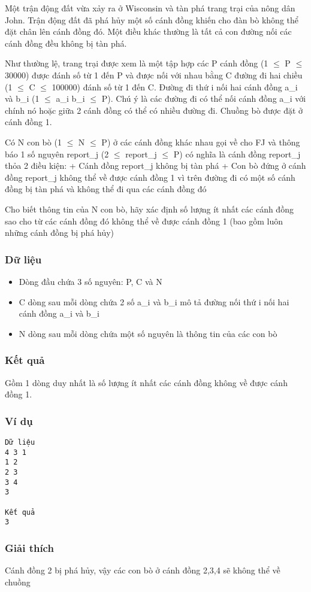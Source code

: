 



   Một trận động đất vừa xảy ra ở Wisconsin và tàn phá trang trại của nông dân John. Trận động đất đã phá hủy một số cánh đồng khiến cho đàn bò không thể đặt chân lên cánh đồng đó. Một điều khác thường là tất cả con đường nối các cánh đồng đều không bị tàn phá.  

   Như thường lệ, trang trại được xem là một tập hợp các P cánh đồng (1 $\le$ P $\le$ 30000) được đánh số từ 1 đến P và được nối với nhau bằng C đường đi hai chiều (1 $\le$ C $\le$ 100000) đánh số từ 1 đến C. Đường đi thứ i nối hai cánh đồng a\_i và b\_i (1 $\le$ a\_i b\_i $\le$ P). Chú ý là các đường đi có thể nối cánh đồng a\_i với chính nó hoặc giữa 2 cánh đồng có thể có nhiều đường đi. Chuồng bò được đặt ở cánh đồng 1.  

   Có N con bò (1 $\le$ N $\le$ P) ở các cánh đồng khác nhau gọi về cho FJ và thông báo 1 số nguyên report\_j (2 $\le$ report\_j $\le$ P) có nghĩa là cánh đồng report\_j thỏa 2 điều kiện: + Cánh đồng report\_j không bị tàn phá + Con bò đứng ở cánh đồng report\_j không thể về được cánh đồng 1 vì trên đường đi có một số cánh đồng bị tàn phá và không thể đi qua các cánh đồng đó  

   Cho biết thông tin của N con bò, hãy xác định số lượng ít nhất các cánh đồng sao cho từ các cánh đồng đó không thể về được cánh đồng 1 (bao gồm luôn những cánh đồng bị phá hủy)  

\subsubsection{   Dữ liệu  }
\begin{itemize}
	\item     Dòng đầu chứa 3 số nguyên: P, C và N   
	\item     C dòng sau mỗi dòng chứa 2 số a\_i và b\_i mô tả đường nối thứ i nối hai cánh đồng a\_i và b\_i   
	\item     N dòng sau mỗi dòng chứa một số nguyên là thông tin của các con bò   
\end{itemize}

\subsubsection{   Kết quả  }

   Gồm 1 dòng duy nhất là số lượng ít nhất các cánh đồng không về được cánh đồng 1.  

\subsubsection{   Ví dụ  }
\begin{verbatim}
Dữ liệu
4 3 1
1 2
2 3
3 4
3

Kết quả
3
\end{verbatim}

\subsubsection{   Giải thích  }

   Cánh đồng 2 bị phá hủy, vậy các con bò ở cánh đồng 2,3,4 sẽ không thể về chuồng  
